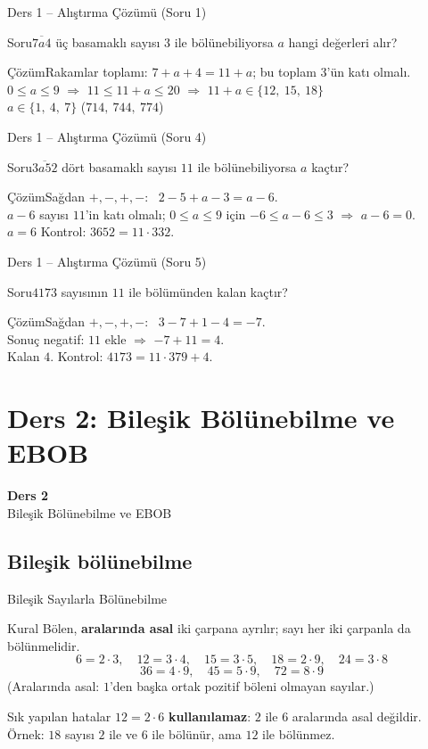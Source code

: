 \documentclass[aspectratio=169,11pt,handout]{beamer}
\newcommand{\soru}[3]{%
\begin{frame}{#1}
  \begin{block}{Soru}\large #2\end{block}
  \pause
  \begin{exampleblock}{Çözüm}\large #3\end{exampleblock}
\end{frame}}
\newcommand{\ab}[1]{\overline{#1}}
\begin{document}
\soru{Ders 1 -- Alıştırma Çözümü (Soru 1)}
{\(\ab{7a4}\) üç basamaklı sayısı \(3\) ile bölünebiliyorsa \(a\) hangi değerleri alır?}
{Rakamlar toplamı: \(7+a+4=11+a\); bu toplam \(3\)'ün katı olmalı.\\[3pt]
\(0\le a\le 9\) \(\Rightarrow\) \(11\le 11+a\le 20\) \(\Rightarrow\) \(11+a\in\{12,\ 15,\ 18\}\)\\[3pt]
\(a\in\{1,\ 4,\ 7\}\) \quad (\(714,\ 744,\ 774\))}

\soru{Ders 1 -- Alıştırma Çözümü (Soru 4)}
{\(\ab{3a52}\) dört basamaklı sayısı \(11\) ile bölünebiliyorsa \(a\) kaçtır?}
{Sağdan \(+,-,+,-\): \ \(2-5+a-3=a-6\).\\[3pt]
\(a-6\) sayısı \(11\)'in katı olmalı; \(0\le a\le 9\) için \(-6\le a-6\le 3\) \(\Rightarrow\) \(a-6=0\).\\[3pt]
\(a=6\) \quad Kontrol: \(3652=11\cdot 332\).}

\soru{Ders 1 -- Alıştırma Çözümü (Soru 5)}
{\(4173\) sayısının \(11\) ile bölümünden kalan kaçtır?}
{Sağdan \(+,-,+,-\): \ \(3-7+1-4=-7\).\\[3pt]
Sonuç negatif: \(11\) ekle \(\Rightarrow\) \(-7+11=4\).\\[3pt]
Kalan \(4\). \quad Kontrol: \(4173=11\cdot 379+4\).}

\section{Ders 2: Bileşik Bölünebilme ve EBOB}
\begin{frame}
\centering\Large\color{anamavi}\textbf{Ders 2}\\[6pt]\normalsize Bileşik Bölünebilme ve EBOB
\end{frame}

\subsection{Bileşik bölünebilme}
\begin{frame}{Bileşik Sayılarla Bölünebilme}
\begin{block}{Kural}
Bölen, \textbf{aralarında asal} iki çarpana ayrılır; sayı her iki çarpanla da bölünmelidir.
\[6=2\cdot 3,\quad 12=3\cdot 4,\quad 15=3\cdot 5,\quad 18=2\cdot 9,\quad 24=3\cdot 8\]
\[36=4\cdot 9,\quad 45=5\cdot 9,\quad 72=8\cdot 9\]
(Aralarında asal: \(1\)'den başka ortak pozitif böleni olmayan sayılar.)
\end{block}
\begin{alertblock}{Sık yapılan hatalar}
\(12=2\cdot 6\) \textbf{kullanılamaz}: \(2\) ile \(6\) aralarında asal değildir.\\
Örnek: \(18\) sayısı \(2\) ile ve \(6\) ile bölünür, ama \(12\) ile bölünmez.
\end{alertblock}
\end{frame}
\end{document}
